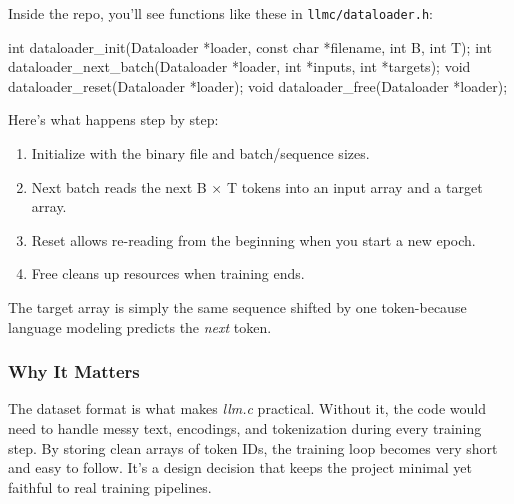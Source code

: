 \documentclass[
  letterpaper,
  DIV=11,
  numbers=noendperiod]{scrreprt}
\newenvironment{Shaded}{\begin{snugshade}}{\end{snugshade}}
\newcommand{\DataTypeTok}[1]{\textcolor[rgb]{0.68,0.00,0.00}{#1}}
\newcommand{\NormalTok}[1]{\textcolor[rgb]{0.00,0.23,0.31}{#1}}
\newcommand{\OperatorTok}[1]{\textcolor[rgb]{0.37,0.37,0.37}{#1}}
\providecommand{\tightlist}{%
  \setlength{\itemsep}{0pt}\setlength{\parskip}{0pt}}
\begin{document}
Inside the repo, you'll see functions like these in
\texttt{llmc/dataloader.h}:

\begin{Shaded}
\begin{Highlighting}[]
\DataTypeTok{int}\NormalTok{ dataloader\_init}\OperatorTok{(}\NormalTok{Dataloader }\OperatorTok{*}\NormalTok{loader}\OperatorTok{,} \DataTypeTok{const} \DataTypeTok{char} \OperatorTok{*}\NormalTok{filename}\OperatorTok{,} \DataTypeTok{int}\NormalTok{ B}\OperatorTok{,} \DataTypeTok{int}\NormalTok{ T}\OperatorTok{);}
\DataTypeTok{int}\NormalTok{ dataloader\_next\_batch}\OperatorTok{(}\NormalTok{Dataloader }\OperatorTok{*}\NormalTok{loader}\OperatorTok{,} \DataTypeTok{int} \OperatorTok{*}\NormalTok{inputs}\OperatorTok{,} \DataTypeTok{int} \OperatorTok{*}\NormalTok{targets}\OperatorTok{);}
\DataTypeTok{void}\NormalTok{ dataloader\_reset}\OperatorTok{(}\NormalTok{Dataloader }\OperatorTok{*}\NormalTok{loader}\OperatorTok{);}
\DataTypeTok{void}\NormalTok{ dataloader\_free}\OperatorTok{(}\NormalTok{Dataloader }\OperatorTok{*}\NormalTok{loader}\OperatorTok{);}
\end{Highlighting}
\end{Shaded}

Here's what happens step by step:

\begin{enumerate}
\def\labelenumi{\arabic{enumi}.}
\tightlist
\item
  Initialize with the binary file and batch/sequence sizes.
\item
  Next batch reads the next B × T tokens into an input array and a
  target array.
\item
  Reset allows re-reading from the beginning when you start a new epoch.
\item
  Free cleans up resources when training ends.
\end{enumerate}

The target array is simply the same sequence shifted by one
token-because language modeling predicts the \emph{next} token.

\subsubsection{Why It Matters}\label{why-it-matters-1}

The dataset format is what makes \emph{llm.c} practical. Without it, the
code would need to handle messy text, encodings, and tokenization during
every training step. By storing clean arrays of token IDs, the training
loop becomes very short and easy to follow. It's a design decision that
keeps the project minimal yet faithful to real training pipelines.
\end{document}
